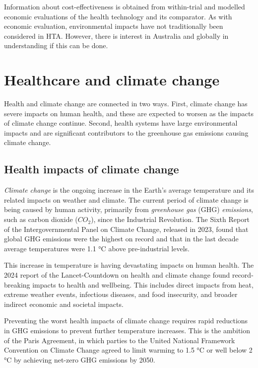 \begin{refsection}
Information about cost-effectiveness is obtained from within-trial and modelled economic evaluations of the health technology and its comparator. As with economic evaluation, environmental impacts have not traditionally been considered in HTA. However, there is interest in Australia and globally in understanding if this can be done.\cite{australian_government_department_of_health_and_aged_care_health_2024}

\section{Healthcare and climate change}
Health and climate change are connected in two ways. First, climate change has severe impacts on human health, and these are expected to worsen as the impacts of climate change continue. Second, health systems have large environmental impacts and are significant contributors to the greenhouse gas emissions causing climate change.

\subsection{Health impacts of climate change}
\textit{Climate change} is the ongoing increase in the Earth’s average temperature and its related impacts on weather and climate. The current period of climate change is being caused by human activity, primarily from \textit{greenhouse gas} (GHG) \textit{emissions}, such as carbon dioxide ($CO_{2}$), since the Industrial Revolution. The Sixth Report of the Intergovernmental Panel on Climate Change, released in 2023, found that global GHG emissions were the highest on record and that in the last decade average temperatures were 1.1 °C above pre-industrial levels.\cite{lee_climate_2023}

This increase in temperature is having devastating impacts on human health. The 2024 report of the Lancet-Countdown on health and climate change found record-breaking impacts to health and wellbeing.\cite{romanello_2024_2024} This includes direct impacts from heat, extreme weather events, infectious diseases, and food insecurity, and broader indirect economic and societal impacts.\cite{romanello_2024_2024}

Preventing the worst health impacts of climate change requires rapid reductions in GHG emissions to prevent further temperature increases. This is the ambition of the Paris Agreement, in which parties to the United National Framework Convention on Climate Change agreed to limit warming to 1.5 °C or well below 2 °C by achieving net-zero GHG emissions by 2050.


\end{refsection}
